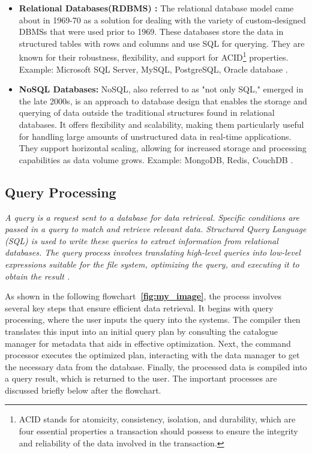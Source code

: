 \begin{itemize}
    \item \textbf{Relational Databases(RDBMS) :} The relational database model came about in 1969-70 as a solution for dealing with the variety of custom-designed DBMSs that were used prior to 1969. These databases store the data in structured tables with rows and columns and use SQL for querying. They are known for their robustness, flexibility, and support for ACID\footnote{ACID stands for atomicity, consistency, isolation, and durability, which are four essential properties a transaction should possess to ensure the integrity and reliability of the data involved in the transaction.} properties. Example: Microsoft SQL Server, MySQL, PostgreSQL, Oracle database \cite{editor-2024,foote-2023}.
    
    \item \textbf{NoSQL Databases:} NoSQL, also referred to as "not only SQL," emerged in the late 2000s, is an approach to database design that enables the storage and querying of data outside the traditional structures found in relational databases. It offers flexibility and scalability, making them particularly useful for handling large amounts of unstructured data in real-time applications. They support horizontal scaling, allowing for increased storage and processing capabilities as data volume grows. Example: MongoDB, Redis, CouchDB \cite{ibm-2024,justacademy_nosql_characteristics}.
\end{itemize}

\subsection{Query Processing }
\noindent\textit{A query is a request sent to a database for data retrieval. Specific conditions are passed in a query to match and retrieve relevant data. Structured Query Language (SQL) is used to write these queries to extract information from relational databases. The query process involves translating high-level queries into low-level expressions suitable for the file system, optimizing the query, and executing it to obtain the result \cite{wwwnaukricom-no-date}.}\vspace{.4cm}

As shown in the following flowchart\textbf{~\ref{fig:my_image}}, the process involves several key steps that ensure efficient data retrieval. It begins with query processing, where the user inputs the query into the systems. The compiler then translates this input into an initial query plan by consulting the catalogue manager for metadata that aids in effective optimization. Next, the command processor executes the optimized plan, interacting with the data manager to get the necessary data from the database. Finally, the processed data is compiled into a query result, which is returned to the user. The important processes are discussed briefly below after the flowchart.

